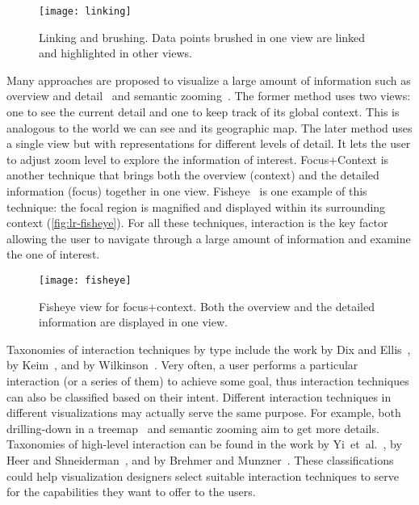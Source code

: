 \begin{figure}
	\centering
	\texttt{[image: linking]}
	\caption[Linking and brushing]{Linking and brushing. Data points brushed in one view are linked and highlighted in other views.}
	\label{fig:lr-linking}
\end{figure}

Many approaches are proposed to visualize a large amount of information such as overview and detail~\cite{Cockburn2008} and semantic zooming~\cite{Perlin1993}. The former method uses two views: one to see the current detail and one to keep track of its global context. This is analogous to the world we can see and its geographic map. The later method uses a single view but with representations for different levels of detail. It lets the user to adjust zoom level to explore the information of interest. Focus+Context is another technique that brings both the overview (context) and the detailed information (focus) together in one view. Fisheye~\cite{Furnas1986,Furnas2006} is one example of this technique: the focal region is magnified and displayed within its surrounding context (\autoref{fig:lr-fisheye}). For all these techniques, interaction is the key factor allowing the user to navigate through a large amount of information and examine the one of interest.

\begin{figure}
	\centering
	\texttt{[image: fisheye]}
	\caption[Fisheye view for focus+context]{Fisheye view for focus+context. Both the overview and the detailed information are displayed in one view. }
\label{fig:lr-fisheye}
\end{figure}

Taxonomies of interaction techniques by type include the work by Dix and Ellis~\cite{Dix1998}, by Keim~\cite{Keim2002}, and by Wilkinson~\cite{Wilkinson2005}. Very often, a user performs a particular interaction (or a series of them) to achieve some goal, thus interaction techniques can also be classified based on their intent. Different interaction techniques in different visualizations may actually serve the same purpose. For example, both drilling-down in a treemap~\cite{Shneiderman1992} and semantic zooming aim to get more details. Taxonomies of high-level interaction can be found in the work by Yi~et~al.~\cite{Yi2007}, by Heer and Shneiderman~\cite{Heer2012}, and by Brehmer and Munzner~\cite{Brehmer2013}. These classifications could help visualization designers select suitable interaction techniques to serve for the capabilities they want to offer to the users.

